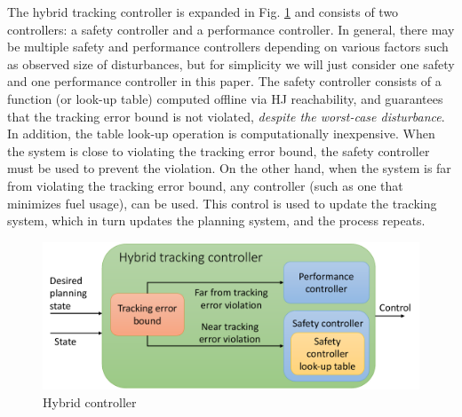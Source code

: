The hybrid tracking controller is expanded in Fig. \ref{fig:hybrid_ctrl} and consists of two controllers: a safety controller and a performance controller. In general, there may be multiple safety and performance controllers depending on various factors such as observed size of disturbances, but for simplicity we will just consider one safety and one performance controller in this paper. The safety controller consists of a function (or look-up table) computed offline via HJ reachability, and guarantees that the tracking error bound is not violated, \textit{despite the worst-case disturbance}. In addition, the table look-up operation is computationally inexpensive. When the system is close to violating the tracking error bound, the safety controller must be used to prevent the violation. On the other hand, when the system is far from violating the tracking error bound, any controller (such as one that minimizes fuel usage), can be used. This control is used to update the tracking system, which in turn updates the planning system, and the process repeats.
\begin{figure}[h!]
  \centering
	\includegraphics[width=0.9\columnwidth]{fig/hybrid_controller}
	\caption{Hybrid controller}
	\label{fig:hybrid_ctrl}
	\vspace{-.1in}
\end{figure}

